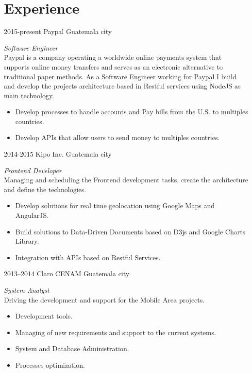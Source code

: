 \documentclass[]{friggeri-cv} %
\begin{document}
\section{Experience}
\begin{entrylist}
\entry
	{2015-present}
	{Paypal}
	{Guatemala city}
	{\emph{Software Engineer} \\
	Paypal is a company operating a worldwide online payments system that supports online money transfers
	and serves as an electronic alternative to traditional paper methods. As a Software Engineer working for
	Paypal I build and develop the projects architecture based in Restful services using NodeJS as main technology.
	\begin{itemize}
		\item Develop processes to handle accounts and Pay bills from the U.S. to multiples countries.
		\item Develop APIs that allow users to send money to multiples countries.
	\end{itemize}
	}

\entry
	{2014-2015}
	{Kipo Inc.}
	{Guatemala city}
	{\emph{Frontend Developer} \\
	Managing and scheduling the Frontend development tasks, create the architecture and define the technologies.
	\begin{itemize}
		\item Develop solutions for real time geolocation using Google Maps and AngularJS.
		\item Build solutions to Data-Driven Documents based on D3js and Google Charts Library.
		\item Integration with APIs based on Restful Services.
	\end{itemize}
	
	}
	
\entry
	{2013--2014}
	{Claro CENAM}
	{Guatemala city}
	{\emph{System Analyst} \\
	Driving the development and support for the Mobile Area projects.
	\begin{itemize}
		\item Development tools.
		\item Managing of new requirements and support to the current systems.
		\item System and Database Administration.
		\item Processes optimization.
		
	\end{itemize}
	}

\end{entrylist}
\end{document}
